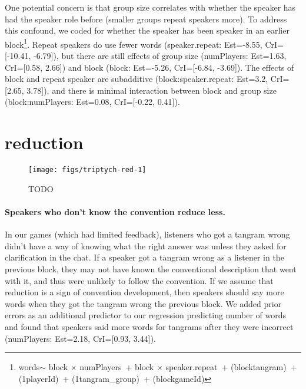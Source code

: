 \documentclass[
  english,
  a4paper,
]{article}
\begin{document}
One potential concern is that group size correlates with whether the speaker has had the speaker role before (smaller groups repeat speakers more). To address this confound, we coded for whether the speaker has been speaker in an earlier block\footnote{words\(\sim\) block \(\times\) numPlayers~+ block \(\times\) speaker.repeat~+ (block\textbar tangram)~+ (1\textbar playerId)~+ (1\textbar tangram\_group)~+ (block\textbar gameId)}. Repeat speakers do use fewer words (speaker.repeat: Est=-8.55, CrI={[}-10.41, -6.79{]}), but there are still effects of group size (numPlayers: Est=1.63, CrI={[}0.58, 2.66{]}) and block (block: Est=-5.26, CrI={[}-6.84, -3.69{]}). The effects of block and repeat speaker are subadditive (block:speaker.repeat: Est=3.2, CrI={[}2.65, 3.78{]}), and there is minimal interaction between block and group size (block:numPlayers: Est=0.08, CrI={[}-0.22, 0.41{]}).

\hypertarget{reduction-1}{%
\section{reduction}\label{reduction-1}}

\begin{figure*}[t!]

{\centering \texttt{[image: figs/triptych-red-1]} 

}

\caption{TODO}\label{fig:triptych-red}
\end{figure*}

\hypertarget{speakers-who-dont-know-the-convention-reduce-less.}{%
\paragraph{Speakers who don't know the convention reduce less.}\label{speakers-who-dont-know-the-convention-reduce-less.}}

In our games (which had limited feedback), listeners who got a tangram wrong didn't have a way of knowing what the right answer was unless they asked for clarification in the chat. If a speaker got a tangram wrong as a listener in the previous block, they may not have known the conventional description that went with it, and thus were unlikely to follow the convention. If we assume that reduction is a sign of convention development, then speakers should say more words when they got the tangram wrong the previous block. We added prior errors as an additional predictor to our regression predicting number of words and found that speakers said more words for tangrams after they were incorrect (numPlayers: Est=2.18, CrI={[}0.93, 3.44{]}).
\end{document}
